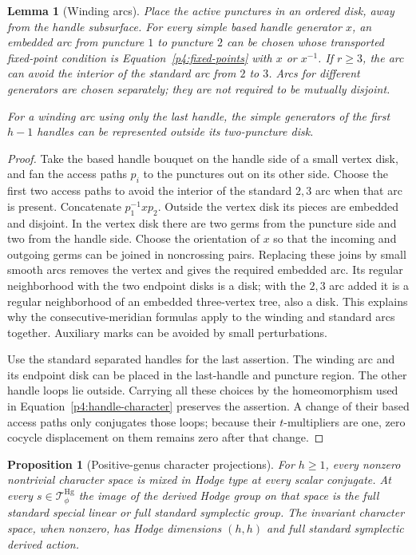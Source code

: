\documentclass[11pt]{article}
\theoremstyle{plain}
\newtheorem{proposition}[theorem]{Proposition}
\newtheorem{lemma}[theorem]{Lemma}
\theoremstyle{definition}
\theoremstyle{remark}
\numberwithin{equation}{section}
\begin{document}
\begin{lemma}[Winding arcs]\label{p4:winding-arcs}
Place the active punctures in an ordered disk, away from the handle
subsurface.  For every simple based handle generator $x$, an embedded
arc from puncture $1$ to puncture $2$ can be chosen whose transported
fixed-point condition is Equation~\eqref{p4:fixed-points} with $x$ or
$x^{-1}$.  If $r\ge3$, the arc can avoid the interior of the standard
arc from $2$ to $3$.  Arcs for different generators are chosen
separately; they are not required to be mutually disjoint.

For a winding arc using only the last handle, the simple generators of
the first $h-1$ handles can be represented outside its two-puncture disk.
\end{lemma}

\begin{proof}
Take the based handle bouquet on the handle side of a small vertex disk,
and fan the access paths $p_i$ to the punctures out on its other side.
Choose the first two access paths to avoid the interior of the standard
$2,3$ arc when that arc is present.  Concatenate
$p_1^{-1}xp_2$.  Outside the vertex disk its pieces are embedded and
disjoint.  In the vertex disk there are two germs from the puncture
side and two from the handle side.  Choose the orientation of $x$ so
that the incoming and outgoing germs can be joined in noncrossing
pairs.  Replacing these joins by small smooth arcs removes the vertex
and gives the required embedded arc.  Its regular neighborhood with
the two endpoint disks is a disk; with the $2,3$ arc added it is a
regular neighborhood of an embedded three-vertex tree, also a disk.
This explains why the consecutive-meridian formulas apply to the
winding and standard arcs together.  Auxiliary marks can be avoided
by small perturbations.

Use the standard separated handles for the last assertion.  The winding
arc and its endpoint disk can be placed in the last-handle and puncture
region.  The other handle loops lie outside.  Carrying all these choices
by the homeomorphism used in Equation~\eqref{p4:handle-character}
preserves the assertion.  A change of their based access paths only
conjugates those loops; because their $t$-multipliers are one, zero
cocycle displacement on them remains zero after that change.
\end{proof}

\begin{proposition}[Positive-genus character projections]
\label{p4:positive-projections}
For $h\ge1$, every nonzero nontrivial character space is mixed in Hodge
type at every scalar conjugate.  At every
$s\in\mathcal T_\phi^{\mathrm{Hg}}$ the image
of the derived Hodge group on that space is the full standard special
linear or full standard symplectic group.  The invariant character space,
when nonzero, has Hodge dimensions $(h,h)$ and full standard symplectic
derived action.
\end{proposition}
\end{document}
